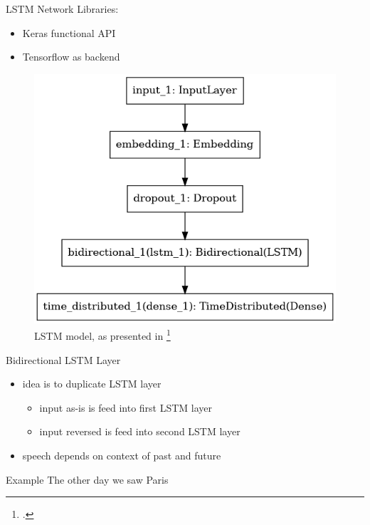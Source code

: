 \documentclass[12pt, tikz]{beamer}
\begin{document}
\begin{frame}[fragile]{LSTM Network}
	Libraries:
	\begin{itemize}
		\item Keras functional API
		\item Tensorflow as backend
	\end{itemize}
	\pause
	\vspace{-0.3cm}
	\begin{figure}
		\includegraphics[width=0.6\textheight]{img/lstm_model.png}
		\caption{LSTM model, as presented in \footcite{huang2015bidirectional}}
	\end{figure}
\end{frame}

\begin{frame}[fragile]{Bidirectional LSTM Layer}
	\begin{itemize}
		\item<1-> idea is to duplicate LSTM layer
		\begin{itemize}
			\item<2-> input as-is is feed into first LSTM layer
			\item<3-> input reversed is feed into second LSTM layer
		\end{itemize}
		\item<4-> speech depends on context of past and future
	\end{itemize}

	\begin{exampleblock}{Example}
		The other day we saw Paris  \uncover<3->{\hspace{-0.25cm}\textcolor{red}{Hilton.}}
	\end{exampleblock} 
\end{frame}
\end{document}
